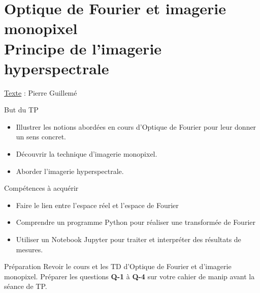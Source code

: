 \documentclass[a4paper,twoside,10pt]{book}
\begin{document}
\def\figurename{Figure}
\def\tablename{Tableau}

\graphicspath{{Images/}}


\renewcommand{\chaptername}{TP}
\chapter{Optique de Fourier et imagerie monopixel\\
Principe de l'imagerie hyperspectrale}

\vspace{-2\baselineskip}
\begin{center}
\underline{Texte} : Pierre Guillemé
\end{center}

\begin{bclogo}[couleur = gray!10, arrondi = 0.1, logo = \bcinfo, barre = none]{But du TP}
\begin{itemize}
\item Illustrer les notions abordées en cours d'Optique de Fourier pour leur donner un sens concret.
\item Découvrir la technique d'imagerie monopixel.
\item Aborder l’imagerie hyperspectrale.
\end{itemize}
\end{bclogo}

\begin{bclogo}[arrondi = 0.1, logo = \bcquestion]{Compétences à acquérir}
\begin{itemize}[label=]
\item Faire le lien entre l'espace réel et l'espace de Fourier
\item Comprendre un programme Python pour réaliser une transformée de Fourier
\item Utiliser un Notebook Jupyter pour traiter et interpréter des résultats de mesures.
\end{itemize}
\end{bclogo}



\begin{bclogo}[arrondi = 0.1, logo = \bccrayon, barre = none]{Préparation}
Revoir le cours et les TD d'Optique de Fourier et d'imagerie monopixel. Préparer les questions \textbf{Q-1} à \textbf{Q-4} sur votre cahier de manip avant la séance de TP.
\end{bclogo}
\end{document}
